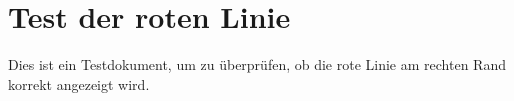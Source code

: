 \documentclass{article}
\begin{document}
\section*{Test der roten Linie}

Dies ist ein Testdokument, um zu überprüfen, ob die rote Linie am rechten Rand korrekt angezeigt wird.
\end{document}
